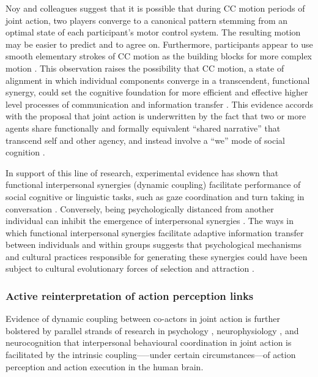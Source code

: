 \begin{CJK}{UTF8}{gbsn}
Noy and colleagues suggest that it is possible that during CC motion periods of joint action, two players converge to a canonical pattern stemming from an optimal state of each participant’s motor control system.  The resulting motion may be easier to predict and to agree on. Furthermore, participants appear to use smooth elementary strokes of CC motion as the building blocks for more complex motion \citep{Noy2017}.  This observation raises the possibility that CC motion, a state of alignment in which individual components converge in a transcendent, functional synergy, could set the cognitive foundation for more efficient and effective higher level processes of communication and information transfer \citep[15]{Lerique2016}.  This evidence accords with the proposal that joint action is underwritten by the fact that two or more agents share functionally and formally equivalent ``shared narrative'' that transcend self and other agency, and instead involve a ``we'' mode of social cognition \citep{Gallotti2013}.

In support of this line of research, experimental evidence has shown that functional interpersonal synergies (dynamic coupling) facilitate performance of social cognitive or linguistic tasks, such as gaze coordination and turn taking in conversation \citep{Miles2010,Richardson2005,Shockley2009}.  Conversely, being psychologically distanced from another individual can inhibit the emergence of interpersonal synergies \citep{Miles2010}.  The ways in which functional interpersonal synergies facilitate adaptive information transfer between individuals and within groups suggests that psychological mechanisms and cultural practices responsible for generating these synergies could have been subject to cultural evolutionary forces of selection and attraction \citep{Claidiere2014,Mesoudi2016a}.





\subsubsection{Active reinterpretation of action perception links}
Evidence of dynamic coupling between co-actors in joint action is further bolstered by parallel strands of research in psychology \citep{Prinz1990,Prinz1997,Prinz2013}, neurophysiology \citep{Rizzolatti2004,Rizzolatti2010}, and neurocognition \citep{Wolpert1998,Wolpert2000} that interpersonal behavioural coordination in joint action is facilitated by the intrinsic coupling—--under certain circumstances---of action perception and action execution in the human brain.


\end{CJK}
